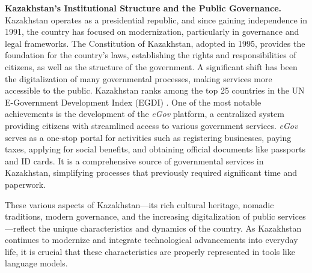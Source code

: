 \textbf{Kazakhstan’s Institutional Structure and the Public Governance.}
Kazakhstan operates as a presidential republic, and since gaining independence in 1991, the country has focused on modernization, particularly in governance and legal frameworks. The Constitution of Kazakhstan, adopted in 1995, provides the foundation for the country’s laws, establishing the rights and responsibilities of citizens, as well as the structure of the government. A significant shift has been the digitalization of many governmental processes, making services more accessible to the public. Kazakhstan ranks among the top 25 countries in the UN E-Government Development Index (EGDI) \citep{UN_EGDI}. One of the most notable achievements is the development of the \textit{eGov} platform, a centralized system providing citizens with streamlined access to various government services. \textit{eGov} serves as a one-stop portal for activities such as registering businesses, paying taxes, applying for social benefits, and obtaining official documents like passports and ID cards. It is a comprehensive source of governmental services in Kazakhstan, simplifying processes that previously required significant time and paperwork. 

These various aspects of Kazakhstan—its rich cultural heritage, nomadic traditions, modern governance, and the increasing digitalization of public services—reflect the unique characteristics and dynamics of the country. As Kazakhstan continues to modernize and integrate technological advancements into everyday life, it is crucial that these characteristics are properly represented in tools like language models.








